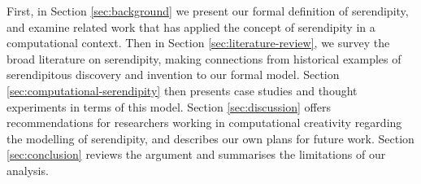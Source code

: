 First, in Section \ref{sec:background} we present our formal
definition of serendipity, and examine related work that has applied
the concept of serendipity in a computational context.  Then in
Section \ref{sec:literature-review}, we survey the broad literature on
serendipity, making connections from historical examples of
serendipitous discovery and invention to our formal model.  Section
\ref{sec:computational-serendipity} then presents case studies and
thought experiments in terms of this model.  Section
\ref{sec:discussion} offers recommendations for researchers working in
computational creativity regarding the modelling of serendipity, and describes our own plans for future
work.  Section \ref{sec:conclusion} reviews the argument and
summarises the limitations of our analysis.


